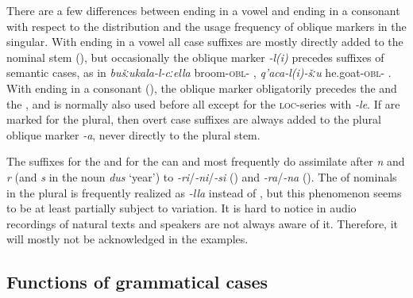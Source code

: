 There are a few differences between  ending in a vowel and  ending in a consonant with respect to the distribution and the usage frequency of oblique markers in the singular. With  ending in a vowel all case suffixes are mostly directly added to the nominal stem (), but occasionally the oblique marker \textit{-l(i)} precedes suffixes of semantic cases, as in \textit{bušːukala-l-cːella} broom-\textsc{obl}- , \textit{q'aca-l(i)-šːu} he.goat-\textsc{obl}- . With  ending in a consonant (), the oblique marker obligatorily precedes the  and the , and is normally also used before all  except for the \textsc{loc}-series with \textit{-le}. If  are marked for the plural, then overt case suffixes are always added to the plural oblique marker \textit{-a}, never directly to the plural stem.

The suffixes for the  and for the  can and most frequently do assimilate after \textit{n} and \textit{r} (and \textit{s} in the noun \textit{dus} `year') to \textit{-ri}/\textit{-ni}/\textit{-si} () and \textit{-ra}/\textit{-na} (). The  of nominals in the plural is frequently realized as \textit{-lla} instead of , but this phenomenon seems to be at least partially subject to variation. It is hard to notice in audio recordings of natural texts and speakers are not always aware of it. Therefore, it will mostly not be acknowledged in the examples. 



\subsection{Functions of grammatical cases} 
\label{ssec:Functionsofgrammaticalcases}



